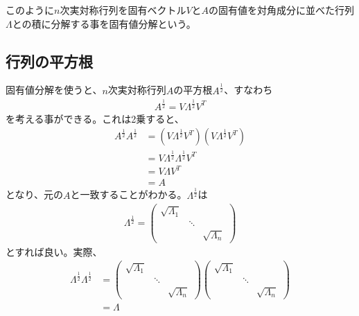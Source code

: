 このように$n$次実対称行列を固有ベクトル$V$と$A$の固有値を対角成分に並べた行列$\Lambda$との積に分解する事を固有値分解という。
\subsection{行列の平方根}
固有値分解を使うと、$n$次実対称行列$A$の平方根$\displaystyle{A^{\frac{1}{2}}}$、すなわち
\begin{align*}
  A^{\frac{1}{2}} = V \Lambda^{\frac{1}{2}} V^T
\end{align*}
を考える事ができる。これは2乗すると、
\begin{align*}
  A^{\frac{1}{2}} A^{\frac{1}{2}} & = (V \Lambda^{\frac{1}{2}} V^T) (V \Lambda^{\frac{1}{2}} V^T) \\
                                  & = V \Lambda^{\frac{1}{2}} \Lambda^{\frac{1}{2}} V^T \\
                                  & = V \Lambda V^T \\
                                  & = A
\end{align*}
となり、元の$A$と一致することがわかる。$\displaystyle{\Lambda^{\frac{1}{2}}}$は
\begin{align*}
  \Lambda^{\frac{1}{2}} = \left(
                            \begin{array}{ccc}
                              \sqrt{\Lambda_1} &        & \\
                                               & \ddots & \\
                                               &        & \sqrt{\Lambda_n}
                            \end{array}
                          \right)
\end{align*}
とすれば良い。実際、
\begin{align*}
  \Lambda^{\frac{1}{2}} \Lambda^{\frac{1}{2}} & = \left(
                                                    \begin{array}{ccc}
                                                      \sqrt{\Lambda_1} &        & \\
                                                                       & \ddots & \\
                                                                       &        & \sqrt{\Lambda_n}
                                                    \end{array}
                                                  \right)
                                                  \left(
                                                    \begin{array}{ccc}
                                                      \sqrt{\Lambda_1} &        & \\
                                                                       & \ddots & \\
                                                                       &        & \sqrt{\Lambda_n}
                                                    \end{array}
                                                  \right) \\
                                              & = \Lambda
\end{align*}

